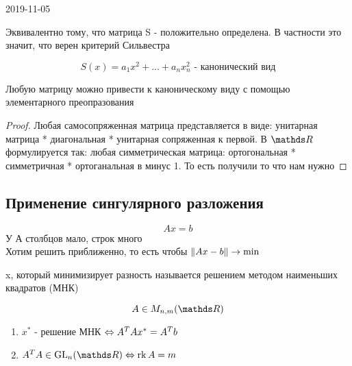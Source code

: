 \documentclass[main]{subfiles}
\begin{document}
\begin{lect}{2019-11-05}
    \begin{remark}
      Эквивалентно тому, что матрица S - положительно определена. В частности это значит, что верен критерий Сильвестра
    \end{remark}

    \begin{Definition}
      \[S(x) = a_1 x^2 + ... + a_n x_n^2 \text{ - канонический вид}\]
    \end{Definition}

    \begin{theorem}
      Любую матрицу можно привести к каноническому виду с помощью элементарного преопразования
    \end{theorem}

    \begin{proof}
      Любая самосопряженная матрица представляется в виде: унитарная матрица * диагональная * унитарная сопряженная к первой. В $\R$ формулируется так: любая симметрическая матрица: ортогональная * симметричная * ортоганальная в минус 1. То есть получили то что нам нужно
    \end{proof}

    \subsection{Применение сингулярного разложения}
    \[Ax = b\]
    У А столбцов мало, строк много\\
    Хотим решить приближенно, то есть чтобы $\lVert Ax-b \rVert \rightarrow \min$

    \begin{definition}
      x, который минимизирует разность называется решением методом наименьших квадратов (МНК)
    \end{definition}

    \begin{Theorem}
      \[A \in M_{n,m}(\R)\]
      \begin{enumerate}
        \item $x^*$ - решение МНК $\Leftrightarrow A^T A x^* = A^T b$
        \item $A^T A \in \GL_n(\R) \lra \rk A = m$
      \end{enumerate}
    \end{Theorem}


\end{lect}
\end{document}
